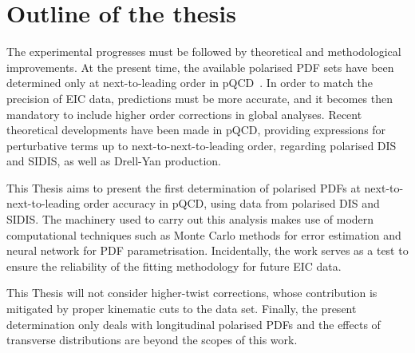 %
\section{Outline of the thesis}

The experimental progresses must be followed by theoretical and methodological improvements. At the present time, the available polarised PDF sets have been determined only at next-to-leading order in pQCD~\cite{Nocera:2014gqa, deFlorian:2008mr, Ethier:2017zbq}. In order to match the precision of EIC data, predictions must be more accurate, and it becomes then mandatory to include higher order corrections in global analyses. Recent theoretical developments have been made in pQCD, providing expressions for perturbative terms up to next-to-next-to-leading order, regarding polarised DIS and SIDIS, as well as Drell-Yan production.%

This Thesis aims to present the first determination of polarised PDFs at next-to-next-to-leading order accuracy in pQCD, using data from polarised DIS and SIDIS. The machinery used to carry out this analysis makes use of modern computational techniques such as Monte Carlo methods for error estimation and neural network for PDF parametrisation. Incidentally, the work serves as a test to ensure the reliability of the fitting methodology for future EIC data.%

This Thesis will not consider higher-twist corrections, whose contribution is mitigated by proper kinematic cuts to the data set. Finally, the present determination only deals with longitudinal polarised PDFs and the effects of transverse distributions are beyond the scopes of this work.%

